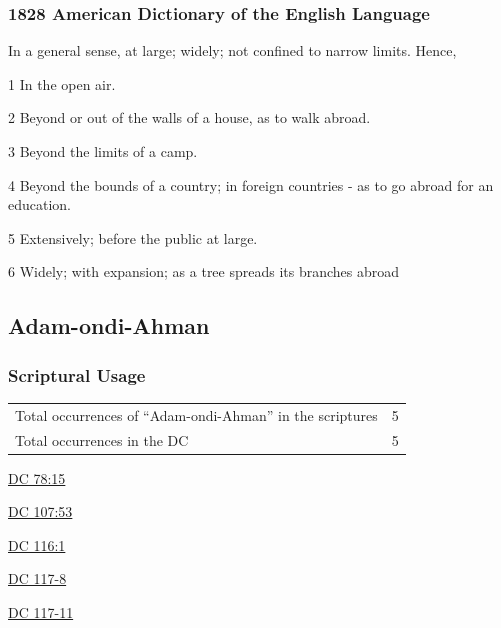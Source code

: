		\subsubsection{1828 American Dictionary of the English Language}
		
			\begin{compactitem}
				\item In a general sense, at large; widely; not confined to narrow limits. Hence,
				\item[1] In the open air.
				\item[2] Beyond or out of the walls of a house, as to walk abroad.
				\item[3] Beyond the limits of a camp.
				\item[4] Beyond the bounds of a country; in foreign countries - as to go abroad for an education.
				\item[5] Extensively; before the public at large.
				\item[6] Widely; with expansion; as a tree spreads its branches abroad
			\end{compactitem}
			
	\subsection{Adam-ondi-Ahman} %
		\label{ADAM-ONDI-AHMAN}
		
		\subsubsection{Scriptural Usage}
		
			\begin{tabular}{ll}
				Total occurrences of ``Adam-ondi-Ahman'' in the scriptures & 5 \\
				Total occurrences in the DC & 5
			\end{tabular}
				
			\begin{compactdesc}
				\item[{\hyperref[DC78-15]{DC 78:15}}]
				\item[{\hyperref[DC107-53]{DC 107:53}}]
				\item[{\hyperref[DC116-1]{DC 116:1}}]
				\item[{\hyperref[DC117-8]{DC 117-8}}]
				\item[{\hyperref[DC117-11]{DC 117-11}}]
			\end{compactdesc}
			
